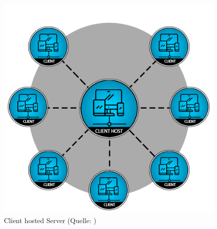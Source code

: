 \begin{figure}[ht]
\centering
\includegraphics[width=1\linewidth]{content/pictures/client-hosted-16be0b1c9b5020f21325b1e6a7beca73.png}
\caption{Client hosted Server (Quelle: \cite{noauthor_network_2024})}
\label{fig:client_server}
\end{figure}



